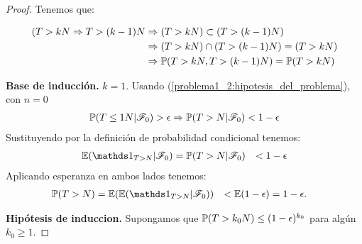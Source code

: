 \begin{proof}
	Tenemos que: 
	
	\begin{align}
		(T>kN \Rightarrow T>(k-1)N 	&\Rightarrow (T>kN) \subset (T>(k-1)N) \\ 
									&\Rightarrow (T>kN) \cap (T>(k-1)N) = (T>kN) \\ 
									&\Rightarrow \mathbb{P}(T>kN, T>(k-1)N) = \mathbb{P}(T>kN)	
	\end{align}
		
	\textbf{Base de inducción.} $k=1$. Usando (\ref{problema1_2:hipotesis_del_problema}), con $n=0$ 
	\begin{align}
		\mathbb{P}(T\leq 1N | \mathscr{F}_0) > \epsilon\Rightarrow
		\mathbb{P}(T>N| \mathscr{F}_0) < 1 - \epsilon
	\end{align}
	Sustituyendo por la definición de probabilidad condicional tenemos:
		\begin{align}
			\E(\indic_{T>N} | \F_0)	&= \mw(T>N| \F_0) 
									&< 1 - \epsilon
		\end{align}
	Aplicando esperanza en ambos lados tenemos:
		\begin{align} 
			\mw(T>N) 	&= 	\E(\E(\indic_{T>N} | \F_0)) 
						&< 	\E(1 - \epsilon) 
						&= 1 - \epsilon.
		\end{align}
	
	\textbf{Hipótesis de induccion.} Supongamos que $\mathbb{P}(T>k_0N)\leq(1 - \epsilon)^{k_0}$ para algún $k_0 \geq 1$.
	

\end{proof}
